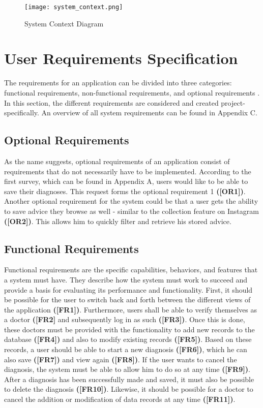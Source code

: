 \begin{figure}[H]
	\centering
	\texttt{[image: system\_context.png]}
	\caption[System Context Diagram ]{System Context Diagram}
\end{figure}
\pagebreak
\section{User Requirements Specification}
The requirements for an application can be divided into three categories: functional requirements, non-functional requirements, and optional requirements \cite[p. 51 ff.]{.req2} \cite{.req}. In this section, the different requirements are considered and created project-specifically. An overview of all system requirements can be found in Appendix C.

\subsection{Optional Requirements}
As the name suggests, optional requirements of an application consist of requirements that do not necessarily have to be implemented. According to the first survey, which can be found in Appendix A, users would like to be able to save their diagnoses. This request forms the optional requirement 1  \textbf{([OR1])}. Another optional requirement for the system could be that a user gets the ability to save advice they browse as well - similar to the collection feature on Instagram \textbf{([OR2])}. This allows him to quickly filter and retrieve his stored advice.

\subsection{Functional Requirements}
Functional requirements are the specific capabilities, behaviors, and features that a system must have. They describe how the system must work to succeed and provide a basis for evaluating its performance and functionality. First, it should be possible for the user to switch back and forth between the different views of the application \textbf{([FR1])}. Furthermore, users shall be able to verify themselves as a doctor \textbf{([FR2]} and subsequently log in as such \textbf{([FR3])}. Once this is done, these doctors must be provided with the functionality to add new records to the database \textbf{([FR4])} and also to modify existing records \textbf{([FR5])}. Based on these records, a user should be able to start a new diagnosis \textbf{([FR6])}, which he can also save \textbf{([FR7])} and view again \textbf{([FR8])}. If the user wants to cancel the diagnosis, the system must be able to allow him to do so at any time \textbf{([FR9])}. After a diagnosis has been successfully made and saved, it must also be possible to delete the diagnosis \textbf{([FR10])}. Likewise, it should be possible for a doctor to cancel the addition or modification of data records at any time \textbf{([FR11])}. 


